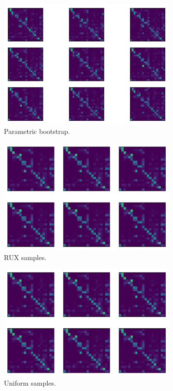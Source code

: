 \begin{figure}
\includegraphics[width=0.8\textwidth]{../images/parametricbootstrap}
\caption{Parametric bootstrap.\label{fig:parametricbootstrap}}
\end{figure}

\begin{figure}
\includegraphics[width=0.8\textwidth]{../images/unif}
\caption{RUX samples.\label{fig:ruxsamples}}
\end{figure}

\begin{figure}
\includegraphics[width=0.8\textwidth]{../images/rux}
\caption{Uniform samples.\label{fig:uniformsamples}}
\end{figure}

